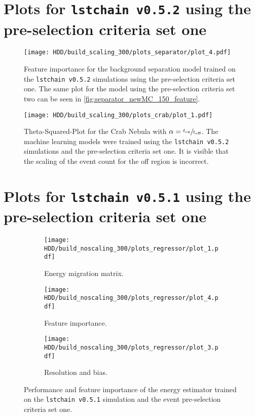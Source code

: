\section{Plots for \texttt{lstchain v0.5.2} using the pre-selection criteria set one}
\begin{figure}
    \centering
    \texttt{[image: HDD/build\_scaling\_300/plots\_separator/plot\_4.pdf]}
    \caption{Feature importance for the background separation model trained on the \texttt{lstchain v0.5.2} simulations using the pre-selection criteria set one.
        The same plot for the model using the pre-selection criteria set two can be seen in \autoref{fig:separator_newMC_150_feature}.
    }
    \label{fig:separator_newMC_300_feature}
\end{figure}
\begin{figure}
    \centering
    \texttt{[image: HDD/build\_scaling\_300/plots\_crab/plot\_1.pdf]}
    \caption{Theta-Squared-Plot for the Crab Nebula with $\alpha = \sfrac{t_\text{on}}{t_\text{off}}$.
        The machine learning models were trained using the \texttt{lstchain v0.5.2} simulations and the pre-selection criteria set one.
        It is visible that the scaling of the event count for the off region is incorrect.
    }
    \label{fig:crab_best_total_time}
\end{figure}


\section{Plots for \texttt{lstchain v0.5.1} using the pre-selection criteria set one}

\begin{figure}
    \centering
    \begin{subfigure}{0.49\textwidth}
        \centering
        \texttt{[image: HDD/build\_noscaling\_300/plots\_regressor/plot\_1.pdf]}
        \caption{Energy migration matrix.}
    \end{subfigure}
    \hfill
    \begin{subfigure}{0.49\textwidth}
        \centering
        \texttt{[image: HDD/build\_noscaling\_300/plots\_regressor/plot\_4.pdf]}
        \caption{Feature importance.}
    \end{subfigure}
    \newline\vfill
    \begin{subfigure}{0.7\textwidth}
        \centering
        \texttt{[image: HDD/build\_noscaling\_300/plots\_regressor/plot\_3.pdf]}
        \caption{Resolution and bias.}
    \end{subfigure}
    \caption{Performance and feature importance of the energy estimator trained on the \texttt{lstchain v0.5.1} simulation and the event pre-selection criteria set one.}
    \label{fig:regressor_oldMC_300}
\end{figure}

